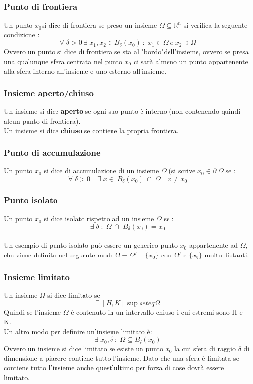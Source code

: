 \documentclass[fontsize = 20px, paper = a4]{article}
\begin{document}
\subsubsection{Punto di frontiera}
Un punto $x_0$si dice di frontiera se preso un insieme $\Omega \subseteq \mathbb{R}^n$ si verifica la seguente condizione : 
$$\forall \; \delta > 0 \; \exists \; x_1,x_2 \in B_\delta (x_0) \; : \; x_1 \in \Omega \; e \; x_2 \ni\Omega $$
Ovvero un punto si dice di frontiera se sta al "bordo"dell'insieme, ovvero se presa una qualunque sfera centrata nel punto $x_0$ ci sarà almeno un punto appartenente alla sfera interno all'insieme e uno esterno all'insieme.
\subsubsection{Insieme aperto/chiuso}
Un insieme si dice \textbf{aperto} se ogni suo punto è interno (non contenendo quindi alcun punto di frontiera).\\
Un insieme si dice \textbf{chiuso} se contiene la propria frontiera.
\subsubsection{Punto di accumulazione}
Un punto $x_0$ si dice di accumulazione di un insieme $\Omega$ (si scrive $x_0 \in \partial \; \Omega$ se :
$$\forall \; \delta > 0 \quad \exists\;x \in \; B_\delta (x_0) \; \cap \;\Omega \quad x \neq x_0$$ 
\subsubsection{Punto isolato}
Un punto $x_0$ si dice isolato rispetto ad un insieme $\Omega$ se :
$$\exists \; \delta \; : \; \Omega \; \cap \; B_\delta (x_0) = x_0$$ \\
Un esempio di punto isolato può essere un generico punto $x_0$ appartenente ad $\Omega$, che viene definito nel seguente mod: $\Omega = \Omega' + \{x_0\}$ con $\Omega'$ e $\{x_0 \}$ molto distanti.
\subsubsection{Insieme limitato}
Un insieme $\Omega $ si dice limitato se 
$$\exists \; [H,K] \sup	seteq \Omega$$ 
Quindi se l'insieme $\Omega$ è contenuto in un intervallo chiuso i cui estremi sono H e K. \\
Un altro modo per definire un'insieme limitato è:
$$\exists \; x_0, \delta \;:\; \Omega \subseteq B_\delta (x_0)$$
Ovvero un insieme si dice limitato se esiste un punto $x_0$ la cui sfera di raggio $\delta$ di dimensione a piacere contiene tutto l'insieme. Dato che una sfera è limitata se contiene tutto l'insieme anche quest'ultimo per forza di cose dovrà essere limitato.
\end{document}
